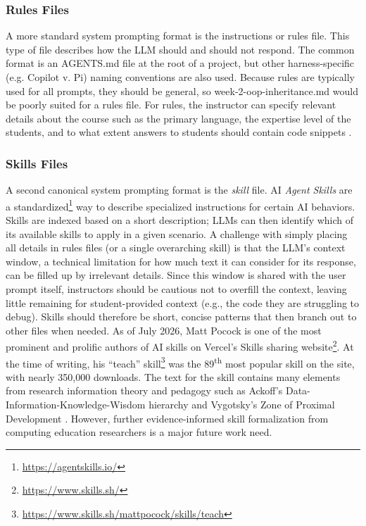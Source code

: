 \subsubsection{Rules Files}\label{rules-files}

A more standard system prompting format is the instructions or rules file. This type of file describes how the LLM should and should not respond. The common format is an AGENTS.md file at the root of a project, but other harness-specific (e.g. Copilot v. Pi) naming conventions are also used. Because rules are typically used for all prompts, they should be general, so week-2-oop-inheritance.md would be poorly suited for a rules file. For rules, the instructor can specify relevant details about the course such as the primary language, the expertise level of the students, and to what extent answers to students should contain code snippets \cite{liffitonCodeHelpUsingLarge2023,liuTeachingCS50AI2024}.

\subsubsection{Skills Files}\label{skills-files}

A second canonical system prompting format is the \emph{skill} file. AI \emph{Agent Skills} are a standardized\footnote{\url{https://agentskills.io/}} way to describe specialized instructions for certain AI behaviors. Skills are indexed based on a short description; LLMs can then identify which of its available skills to apply in a given scenario. A challenge with simply placing all details in rules files (or a single overarching skill) is that the LLM's context window, a technical limitation for how much text it can consider for its response, can be filled up by irrelevant details. Since this window is shared with the user prompt itself, instructors should be cautious not to overfill the context, leaving little remaining for student-provided context (e.g., the code they are struggling to debug). Skills should therefore be short, concise patterns that then branch out to other files when needed. As of July 2026, Matt Pocock \cite{pocockMattpocockSkills2026} is one of the most prominent and prolific authors of AI skills on Vercel's Skills sharing website\footnote{\url{https://www.skills.sh/}}. At the time of writing, his ``teach'' skill\footnote{\url{https://www.skills.sh/mattpocock/skills/teach}} was the 89\textsuperscript{th} most popular skill on the site, with nearly 350,000 downloads. The text for the skill contains many elements from research information theory and pedagogy such as Ackoff's Data-Information-Knowledge-Wisdom hierarchy \cite{ackoffDataWisdom1989} and Vygotsky's Zone of Proximal Development \cite{vygotskyMindSocietyDevelopment1978a}. However, further evidence-informed skill formalization from computing education researchers is a major future work need.

